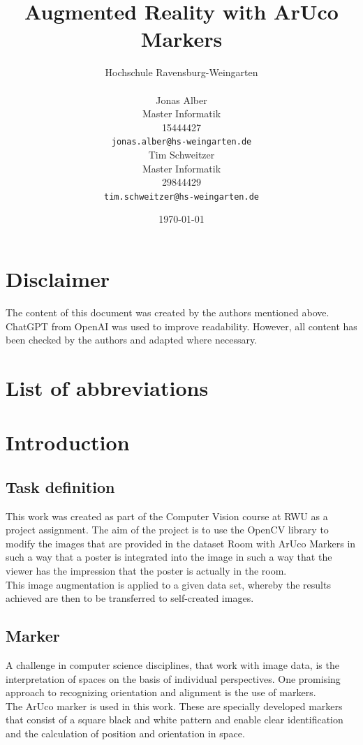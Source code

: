 \documentclass[a4paper,twocolumn]{article}
\title{Augmented Reality with ArUco Markers}
\author{
    Hochschule Ravensburg-Weingarten \\[1em] %
    \begin{minipage}[t]{0.45\textwidth} %
        \centering
        Jonas Alber \\ %
        Master Informatik \\
        15444427\\
        \texttt{jonas.alber@hs-weingarten.de} %
    \end{minipage}
    \hfill
    \begin{minipage}[t]{0.45\textwidth} %
        \centering
        Tim Schweitzer \\ Master Informatik \\  29844429  \\%
        \texttt{tim.schweitzer@hs-weingarten.de} %
    \end{minipage}
}
\date{\today}
\begin{document}
\maketitle

\section*{Disclaimer}
The content of this document was created by the authors mentioned above. ChatGPT from OpenAI was used to improve readability. However, all content has been checked by the authors and adapted where necessary.

\section*{List of abbreviations}
\begin{acronym}[RWU]
\end{acronym}

\section{Introduction}

\subsection{Task definition}
This work was created as part of the Computer Vision course at \ac{RWU} as a project assignment. The aim of the project is to use the OpenCV library to modify the images that are provided in the dataset Room with ArUco Markers in such a way that a poster is integrated into the image in such a way that the viewer has the impression that the poster is actually in the room.
\\
This image augmentation is applied to a given data set, whereby the results achieved are then to be transferred to self-created images.

\subsection{Marker}
A challenge in computer science disciplines, that work with image data, is the interpretation of spaces on the basis of individual perspectives. One promising approach to recognizing orientation and alignment is the use of markers.
\\
The ArUco marker is used in this work. These are specially developed markers that consist of a square black and white pattern and enable clear identification and the calculation of position and orientation in space. \cite{ArUco1}
\end{document}
